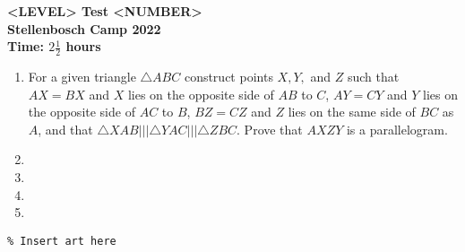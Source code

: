 \documentclass{article}
\begin{document}
\thispagestyle{empty}

\begin{center}
  \textbf{\Large <LEVEL> Test <NUMBER>}
  \\ \vspace{1em}
  \textbf{\large Stellenbosch Camp 2022}
  \\ \vspace{1em}
  \textbf{\large Time: $2\frac{1}{2}$ hours}
\end{center}

\bigskip

\begin{enumerate}[itemsep=\fill]

\item %
For a given triangle $\triangle ABC$ construct points $X,Y,$ and $Z$ such that $AX=BX$ and $X$ lies on the opposite side of $AB$ to $C$, $AY=CY$ and $Y$ lies on the opposite side of $AC$ to $B$, $BZ=CZ$ and $Z$ lies on the same side of $BC$ as $A$, and that $\triangle XAB ||| \triangle YAC ||| \triangle ZBC
$. Prove that $AXZY$ is a parallelogram.



\item %


\item %


\item %


\item %

\end{enumerate}


\centering
\small
\begin{BVerbatim}
\end{BVerbatim}
\end{document}

